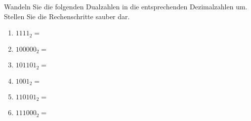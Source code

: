 \begin{exercise}
Wandeln Sie die folgenden Dualzahlen in die entsprechenden Dezimalzahlen um. Stellen Sie die Rechenschritte sauber dar.

\begin{multicols}{2}
\begin{enumerate}

\item $1111_2= $ \\
\begin{minipage}{\linewidth}
\centering
\fillwithgrid{1in}
\end{minipage}

\item $100000_2= $ \\
\begin{minipage}{\linewidth}
\centering
\fillwithgrid{1in}
\end{minipage}

\item $101101_2= $ \\
\begin{minipage}{\linewidth}
\centering
\fillwithgrid{1in}
\end{minipage}

\item $1001_2= $ \\
\begin{minipage}{\linewidth}
\centering
\fillwithgrid{1in}
\end{minipage}

\item $110101_2= $ \\
\begin{minipage}{\linewidth}
\centering
\fillwithgrid{1in}
\end{minipage}

\item $111000_2= $ \\
\begin{minipage}{\linewidth}
\centering
\fillwithgrid{1in}
\end{minipage}

\end{enumerate}
\end{multicols}
\end{exercise}

